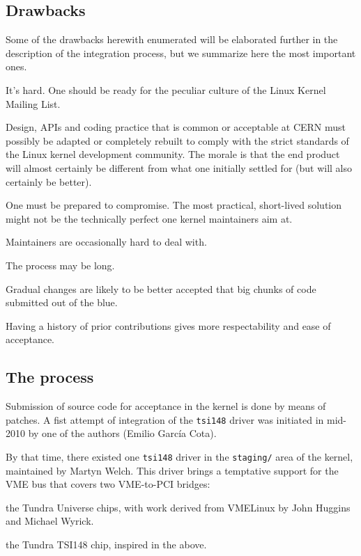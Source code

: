 \documentclass{JAC2003}
\begin{document}
\subsection{Drawbacks}

Some of the drawbacks herewith enumerated will be elaborated further in
the description of the integration process, but we summarize here the
most important ones.

\begin{Itemize}
\item It's hard. One should be ready for the peculiar culture of the
    Linux Kernel Mailing List.
\item Design, APIs and coding practice that is common or acceptable at
    CERN must possibly be adapted or completely rebuilt to comply with the
    strict standards of the Linux kernel development community. The morale
    is that the end product will almost certainly be different from what one
    initially settled for (but will also certainly be better).
\item One must be prepared to compromise. The most practical,
    short-lived solution might not be the technically perfect one kernel
    maintainers aim at.
\item Maintainers are occasionally hard to deal with.
\item The process may be long.
\item Gradual changes are likely to be better accepted that big chunks
    of code submitted out of the blue.  
\item Having a history of prior contributions gives more respectability
    and ease of acceptance.
\end{Itemize}

\subsection{The process}

Submission of source code for acceptance in the kernel is done by means
of patches. A fist attempt of integration of the \verb|tsi148| driver
was initiated in mid-2010 by one of the authors (Emilio Garc\'ia
Cota). 

By that time, there existed one \verb|tsi148| driver in the
\texttt{staging/} area of the kernel, maintained by Martyn Welch. This
driver brings a temptative support for the VME bus that covers
two VME-to-PCI bridges:
\begin{Itemize}
\item the Tundra Universe chips, with work derived from VMELinux by John
Huggins and Michael Wyrick.
\item the Tundra TSI148 chip, inspired in the above.
\end{Itemize}
\end{document}
